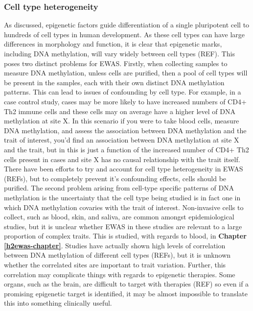 \documentclass[11pt,twoside]{bristolthesis}
\begin{document}
\hypertarget{cell-type-heterogeneity}{%
\subsubsection{Cell type heterogeneity}\label{cell-type-heterogeneity}}

As discussed, epigenetic factors guide differentiation of a single pluripotent cell to hundreds of cell types in human development. As these cell types can have large differences in morphology and function, it is clear that epigenetic marks, including DNA methylation, will vary widely between cell types (REF). This poses two distinct problems for EWAS. Firstly, when collecting samples to measure DNA methylation, unless cells are purified, then a pool of cell types will be present in the samples, each with their own distinct DNA methylation patterns. This can lead to issues of confounding by cell type. For example, in a case control study, cases may be more likely to have increased numbers of CD4+ Th2 immune cells and these cells may on average have a higher level of DNA methylation at site X. In this scenario if you were to take blood cells, measure DNA methylation, and assess the association between DNA methylation and the trait of interest, you'd find an association between DNA methylation at site X and the trait, but in this is just a function of the increased number of CD4+ Th2 cells present in cases and site X has no causal relationship with the trait itself. There have been efforts to try and account for cell type heterogeneity in EWAS (REFs), but to completely prevent it's confounding effects, cells should be purified. The second problem arising from cell-type specific patterns of DNA methylation is the uncertainty that the cell type being studied is in fact one in which DNA methylation covaries with the trait of interest. Non-invasive cells to collect, such as blood, skin, and saliva, are common amongst epidemiological studies, but it is unclear whether EWAS in these studies are relevant to a large proportion of complex traits. This is studied, with regards to blood, in \textbf{Chapter \ref{h2ewas-chapter}}. Studies have actually shown high levels of correlation between DNA methylation of different cell types (REFs), but it is unknown whether the correlated sites are important to trait variation. Further, this correlation may complicate things with regards to epigenetic therapies. Some organs, such as the brain, are difficult to target with therapies (REF) so even if a promising epigenetic target is identified, it may be almost impossible to translate this into something clinically useful.
\end{document}
